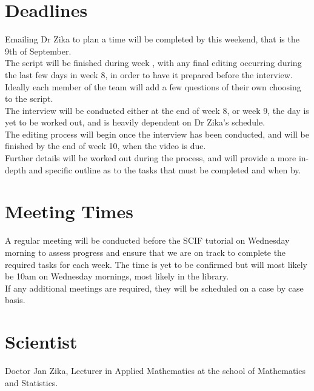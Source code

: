 \documentclass[a4paper]{article}
\begin{document}
\section{Deadlines}
Emailing Dr Zika to plan a time will be completed by this weekend, that is the 9th of September.\\
The script will be finished during week , with any final editing occurring during the last few days in week 8, in order to have it prepared before the interview. Ideally each member of the team will add a few questions of their own choosing to the script.\\
The interview will be conducted either at the end of week 8, or week 9, the day is yet to be worked out, and is heavily dependent on Dr Zika's schedule.\\
The editing process will begin once the interview has been conducted, and will be finished by the end of week 10, when the video is due.\\
Further details will be worked out during the process, and will provide a more in-depth and specific outline as to the tasks that must be completed and when by.\\

\section{Meeting Times}
A regular meeting will be conducted before the SCIF tutorial on Wednesday morning to assess progress and ensure that we are on track to complete the required tasks for each week. The time is yet to be confirmed but will most likely be 10am on Wednesday mornings, most likely in the library.\\
If any additional meetings are required, they will be scheduled on a case by case basis.\\

\section{Scientist}
Doctor Jan Zika, Lecturer in Applied Mathematics at the school of Mathematics and Statistics.
\end{document}
